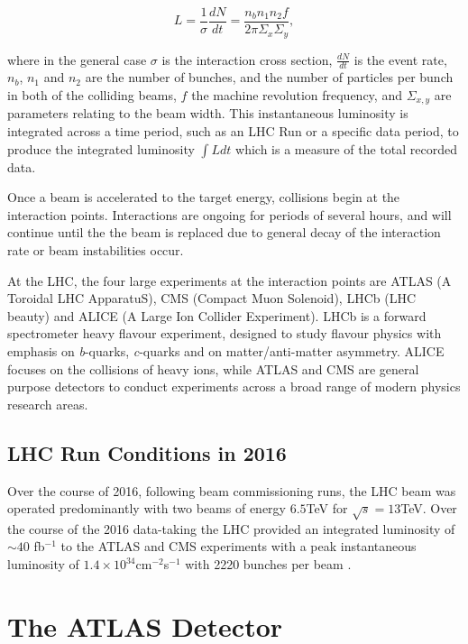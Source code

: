 	\begin{equation}
		L = \frac{1}{\sigma}\frac{dN}{dt} = \frac{n_bn_1n_2f}{2\pi\Sigma_x\Sigma_y},
	\end{equation}

	where in the general case $\sigma$ is the interaction cross section, $\frac{dN}{dt}$ is the event rate, $n_b$, $n_1$ and $n_2$ are the number of bunches, and the number of particles per bunch in both of the colliding beams, $f$ the machine revolution frequency, and $\Sigma_{x, y}$ are parameters relating to the beam width. This instantaneous luminosity is integrated across a time period, such as an LHC Run or a specific data period, to produce the integrated luminosity $\int L dt$ which is a measure of the total recorded data.

	Once a beam is accelerated to the target energy, collisions begin at the interaction points. Interactions are ongoing for periods of several hours, and will continue until the the beam is replaced due to general decay of the interaction rate or beam instabilities occur.

	At the LHC, the four large experiments at the interaction points are ATLAS \cite{ATLAS}(A Toroidal LHC ApparatuS), CMS \cite{CMS}(Compact Muon Solenoid), LHCb \cite{LHCB}(LHC beauty) and ALICE \cite{ALICE}(A Large Ion Collider Experiment). LHCb is a forward spectrometer heavy flavour experiment, designed to study flavour physics with emphasis on \textit{b}-quarks, \textit{c}-quarks and on matter/anti-matter asymmetry. ALICE focuses on the collisions of heavy ions, while ATLAS and CMS are general purpose detectors to conduct experiments across a broad range of modern physics research areas.

	\subsection{LHC Run Conditions in 2016}

	Over the course of 2016, following beam commissioning runs, the LHC beam was operated predominantly with two beams of energy $6.5$TeV for $\sqrt{s}=13$TeV. Over the course of the 2016 data-taking the LHC provided an integrated luminosity of $\sim40$ fb$^{-1}$ to the ATLAS and CMS experiments with a peak instantaneous luminosity of $1.4\times10^{34}$cm$^{-2}$s$^{-1}$ with 2220 bunches per beam \cite{Run2016}.


\newpage
\section{The ATLAS Detector}
\label{d:ATLAS}

